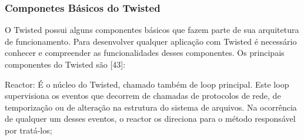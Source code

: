 \documentclass[journal]{IEEEtran}
\begin{document}



\subsubsection{Componetes Básicos do Twisted}

O Twisted possui alguns componentes básicos que fazem parte de sua arquitetura de funcionamento. Para desenvolver qualquer aplicação com Twisted é necessário conhecer e compreender as funcionalidades desses componentes. Os principais componentes do Twisted são [43]:

Reactor: É o núcleo do Twisted, chamado também de loop principal. Este loop supervisiona os eventos que decorrem de chamadas de protocolos de rede, de temporização ou de alteração na estrutura do sistema de arquivos. Na ocorrência de qualquer um desses eventos, o reactor os direciona para o método responsável por tratá-los;
\end{document}

